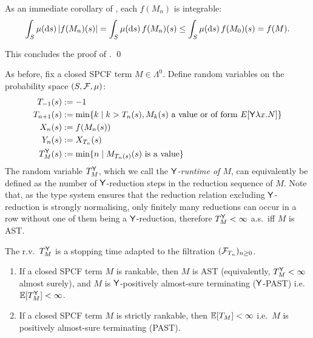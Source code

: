 As an immediate corollary of , each $f(M_n)$ is integrable:
\[
\int_{S} \mu(\mathrm{d} s) \, |f(M_n)(s)| 
=
\int_{S} \mu(\mathrm{d} s) \, f(M_n)(s)
\leq
\int_{S} \mu(\mathrm{d} s) \, f(M_0)(s)
=
f(M).
\]

\iffalse
[** To see $f_{2, n+1}(M) \leq f(M_n)[T_2]$, take $s \in T_2$. Then $f_{2, n+1}(M)(s) = f(E[\underline{a}])$ and $M_n = E[\tsample]$, for some $a \in [0, 1]$ and evaluation context $E$. Hence 
\[
f_{2, n+1}(M)(s) \leq \int_I f(E[\underline{r}]) \, \mu_{leb}(\textrm{d} r)
\leq f(E[\tsample]) = f(M_n)[T_2](s).
\]
**]
\fi
This concludes the proof of %
. \hfill \qed

\medskip
As before, fix a closed SPCF term $M \in \Lambda^0$.
Define random variables on the probability space $(S, \mathcal{F}, \mu)$:
\begin{align}
T_{-1}(s) & := -1 \nonumber \\
T_{n+1}(s) & := \min \{ k \mid k>T_n(s), M_k(s) \textrm{ a value or of form } E[\mathsf{Y} \lambda x. N] \} \nonumber \\
X_n(s) & := f(M_n(s)) \nonumber \\
Y_n(s) & := X_{T_n}(s) \nonumber \\
T_M^{\mathsf{Y}}(s) &:= \min \{n \mid M_{T_n(s)}(s) \textrm{ is a value}\} \label{eq:y stopping time}
\end{align}
The random variable $T_M^{\mathsf{Y}}$, which we call the \emph{$\mathsf{Y}$-runtime of $M$}, can equivalently be defined as the number of $\mathsf{Y}$-reduction steps in the reduction sequence of $M$. 
Note that, as the type system ensures that the reduction relation excluding $\mathsf{Y}$-reduction is strongly normalising, only finitely many reductions can occur in a row without one of them being a $\mathsf{Y}$-reduction, therefore $T_M^{\mathsf{Y}} < \infty$ a.s.~iff $M$ is AST.

The r.v.~$T_M^{\mathsf{Y}}$ is a stopping time adapted to the filtration $(\mathcal{F}_{T_n})_{n \geq 0}$.


\begin{theorem}[Soundness] \label{thm:rankable implies termination}
\begin{enumerate}
\item If a closed SPCF term $M$ is rankable, then $M$ is AST (equivalently, $T^{\mathsf{Y}}_M < \infty$ almost surely), and $M$ is $\mathsf{Y}$-positively almost-sure terminating ($\mathsf{Y}$-PAST) i.e.~$\mathbb{E}[T^{\mathsf{Y}}_M] < \infty$. 

\item If a closed SPCF term $M$ is strictly rankable, then $\mathbb{E}[T_M] < \infty$ i.e.~$M$ is positively almost-sure terminating (PAST).
\end{enumerate}
\end{theorem}

